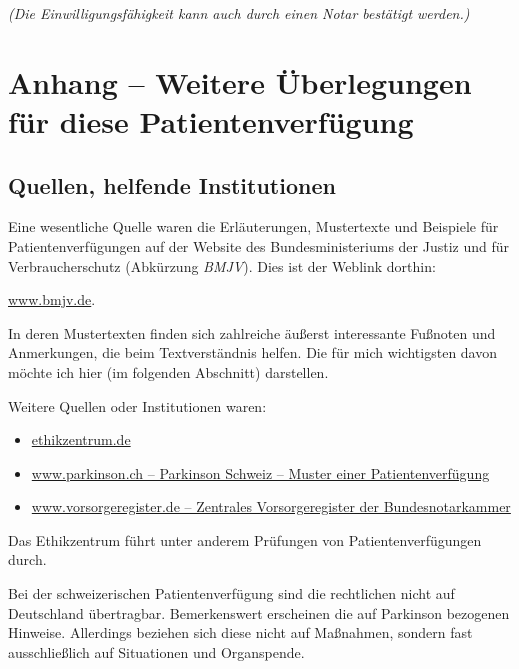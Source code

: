 \documentclass[pdftex,12pt,a4paper]{article}
\begin{document}
\textit{(Die Einwilligungsfähigkeit kann auch durch
 einen Notar bestätigt werden.)}


\newpage

\section*{Anhang -- Weitere Überlegungen für diese Patientenverfügung}

\subsection*{Quellen, helfende Institutionen}

Eine wesentliche Quelle waren die Erläuterungen, Mustertexte und 
Beispiele für Patientenverfügungen auf der Website des
Bundesministeriums der Justiz und für Verbraucherschutz (Abkürzung \textit{BMJV}). Dies ist der Weblink dorthin: 

\href{https://www.bmjv.de/DE/Themen/VorsorgeUndPatientenrechte/Betreuungsrecht/Betreuungsrecht_node.html}{www.bmjv.de}.

In deren Mustertexten finden sich zahlreiche äußerst interessante Fußnoten 
und Anmerkungen, die beim Textverständnis helfen. Die für mich wichtigsten davon möchte ich hier (im folgenden Abschnitt) darstellen.

Weitere Quellen oder Institutionen waren:

\begin{itemize}

\item \href{http://ethikzentrum.de/}{ethikzentrum.de}

\item \href{https://www.parkinson.ch/fileadmin/public/docs/Patientenverfuegung_deutsch/PV_2013_DE_final.pdf}{www.parkinson.ch -- Parkinson Schweiz -- Muster einer Patientenverfügung}

\item \href{http://www.vorsorgeregister.de/}{www.vorsorgeregister.de --
Zentrales Vorsorgeregister der Bundesnotarkammer}


\end{itemize}

Das Ethikzentrum führt unter anderem Prüfungen von Patientenverfügungen
durch.

Bei der schweizerischen Patientenverfügung sind die rechtlichen
nicht auf Deutschland übertragbar. Bemerkenswert erscheinen 
die auf Parkinson bezogenen Hinweise. Allerdings beziehen sich diese
nicht auf Maßnahmen, sondern fast ausschließlich auf Situationen 
und Organspende.
  
\end{document}
